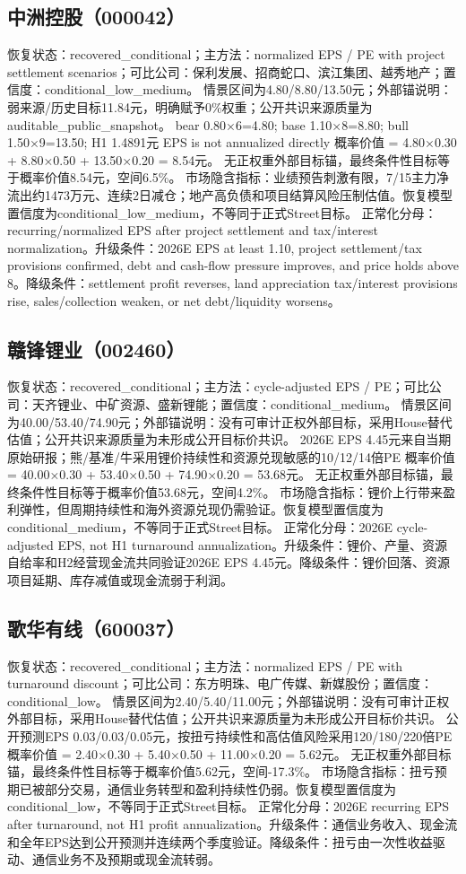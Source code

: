 \subsection{中洲控股（000042）}
恢复状态：recovered\_conditional；主方法：normalized EPS / PE with project settlement scenarios；可比公司：保利发展、招商蛇口、滨江集团、越秀地产；置信度：conditional\_low\_medium。
情景区间为4.80/8.80/13.50元；外部锚说明：弱来源/历史目标11.84元，明确赋予0\%权重；公开共识来源质量为auditable\_public\_snapshot。
bear 0.80×6=4.80; base 1.10×8=8.80; bull 1.50×9=13.50; H1 1.4891元 EPS is not annualized directly
概率价值 = 4.80×0.30 + 8.80×0.50 + 13.50×0.20 = 8.54元。
无正权重外部目标锚，最终条件性目标等于概率价值8.54元，空间6.5\%。
市场隐含指标：业绩预告刺激有限，7/15主力净流出约1473万元、连续2日减仓；地产高负债和项目结算风险压制估值。恢复模型置信度为conditional\_low\_medium，不等同于正式Street目标。
正常化分母：recurring/normalized EPS after project settlement and tax/interest normalization。升级条件：2026E EPS at least 1.10, project settlement/tax provisions confirmed, debt and cash-flow pressure improves, and price holds above 8。降级条件：settlement profit reverses, land appreciation tax/interest provisions rise, sales/collection weaken, or net debt/liquidity worsens。
\subsection{赣锋锂业（002460）}
恢复状态：recovered\_conditional；主方法：cycle-adjusted EPS / PE；可比公司：天齐锂业、中矿资源、盛新锂能；置信度：conditional\_medium。
情景区间为40.00/53.40/74.90元；外部锚说明：没有可审计正权外部目标，采用House替代估值；公开共识来源质量为未形成公开目标价共识。
2026E EPS 4.45元来自当期原始研报；熊/基准/牛采用锂价持续性和资源兑现敏感的10/12/14倍PE
概率价值 = 40.00×0.30 + 53.40×0.50 + 74.90×0.20 = 53.68元。
无正权重外部目标锚，最终条件性目标等于概率价值53.68元，空间4.2\%。
市场隐含指标：锂价上行带来盈利弹性，但周期持续性和海外资源兑现仍需验证。恢复模型置信度为conditional\_medium，不等同于正式Street目标。
正常化分母：2026E cycle-adjusted EPS, not H1 turnaround annualization。升级条件：锂价、产量、资源自给率和H2经营现金流共同验证2026E EPS 4.45元。降级条件：锂价回落、资源项目延期、库存减值或现金流弱于利润。
\subsection{歌华有线（600037）}
恢复状态：recovered\_conditional；主方法：normalized EPS / PE with turnaround discount；可比公司：东方明珠、电广传媒、新媒股份；置信度：conditional\_low。
情景区间为2.40/5.40/11.00元；外部锚说明：没有可审计正权外部目标，采用House替代估值；公开共识来源质量为未形成公开目标价共识。
公开预测EPS 0.03/0.03/0.05元，按扭亏持续性和高估值风险采用120/180/220倍PE
概率价值 = 2.40×0.30 + 5.40×0.50 + 11.00×0.20 = 5.62元。
无正权重外部目标锚，最终条件性目标等于概率价值5.62元，空间-17.3\%。
市场隐含指标：扭亏预期已被部分交易，通信业务转型和盈利持续性仍弱。恢复模型置信度为conditional\_low，不等同于正式Street目标。
正常化分母：2026E recurring EPS after turnaround, not H1 profit annualization。升级条件：通信业务收入、现金流和全年EPS达到公开预测并连续两个季度验证。降级条件：扭亏由一次性收益驱动、通信业务不及预期或现金流转弱。
